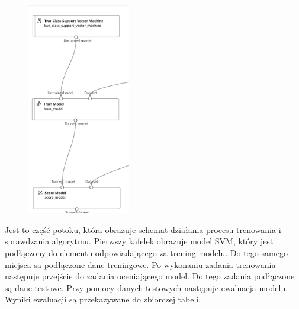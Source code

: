 \begin{figure}[H]
    \centering
    \includegraphics[width=0.4\textwidth]{images/svm_pipe}
    \label{fig:svm-pipe}
\end{figure}

Jest to część potoku, która obrazuje schemat działania procesu trenowania i sprawdzania algorytmu. Pierwszy kafelek obrazuje model SVM, który jest podłączony do elementu odpowiadającego za trening modelu. Do tego samego miejsca sa podłączone dane treningowe. Po wykonaniu zadania trenowania następuje przejście do zadania oceniającego model. Do tego zadania podłączone są dane testowe. Przy pomocy danych testowych następuje ewaluacja modelu. Wyniki ewaluacji są przekazywane do zbiorczej tabeli.

